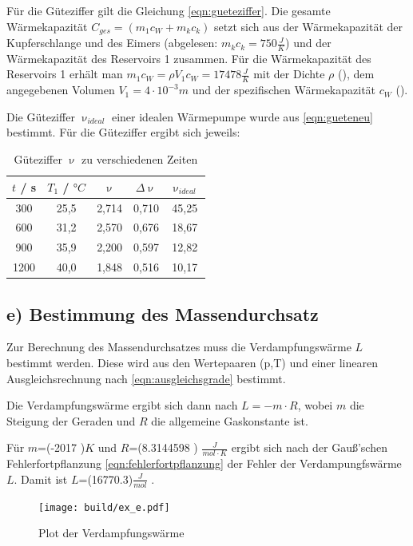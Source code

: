 Für die Güteziffer gilt die Gleichung \eqref{eqn:gueteziffer}.
Die gesamte Wärmekapazität $C_{ges} = (m_1 c_W + m_k c_k)$ setzt sich aus der Wärmekapazität der Kupferschlange und des Eimers (abgelesen: $m_k c_k = 750 \frac{J}{K}$) und der Wärmekapazität des Reservoirs 1 zusammen.
Für die Wärmekapazität des Reservoirs 1 erhält man $m_1 c_W = \rho V_1 c_W = 17478 \frac{J}{K}$ mit der Dichte $\rho$ (\cite{geschke}), dem angegebenen Volumen $V_1 = 4 \cdot 10^{-3} m$ und der spezifischen Wärmekapazität $c_W$ (\cite{geschke}).

Die Güteziffer $\upnu_{ideal}$ einer idealen Wärmepumpe wurde aus \eqref{eqn:gueteneu} bestimmt.
Für die Güteziffer ergibt sich jeweils:
\begin{table}
	\centering
	\caption{Güteziffer $\upnu$ zu verschiedenen Zeiten}
	\label{tab:gueteziffer}
\begin{tabular}{ccccc}
	\toprule
	$t$ / s & $T_1$ / $°C$ & $\upnu$ & $\Delta \upnu$ & $\upnu_{ideal}$ \\
	\midrule
	300 & 25,5 & 2,714 & 0,710 & 45,25 \\
	600 & 31,2 & 2,570 & 0,676 & 18,67 \\
	900 & 35,9 & 2,200 & 0,597 & 12,82 \\
	1200 & 40,0 & 1,848 & 0,516 & 10,17 \\
	\bottomrule
\end{tabular}
\end{table}


\subsection{e) Bestimmung des Massendurchsatz}
\label{sec:massendurchsatz}
Zur Berechnung des Massendurchsatzes muss die Verdampfungswärme $L$ bestimmt werden.
Diese wird aus den Wertepaaren (p,T) und einer linearen Ausgleichsrechnung nach \eqref{eqn:ausgleichsgrade} bestimmt.

Die Verdampfungswärme ergibt sich dann nach $ L = −m \cdot R$, wobei $m$ die Steigung der Geraden und $R$ die allgemeine Gaskonstante ist.

Für $m$=(-2017 )$K$ und $R$=(8.3144598 ) $\frac{J}{mol\cdot K}$ \cite{gas}
ergibt sich nach der Gauß’schen Fehlerfortpflanzung \eqref{eqn:fehlerfortpflanzung} der Fehler der Verdampungfswärme $L$.
Damit ist $L$=(16770.3)$\frac{J}{mol}$ .


\begin{figure}
  \centering
  \texttt{[image: build/ex\_e.pdf]}
  \caption{Plot der Verdampfungswärme}
  \label{fig:verdampfungswaerme}
\end{figure}


